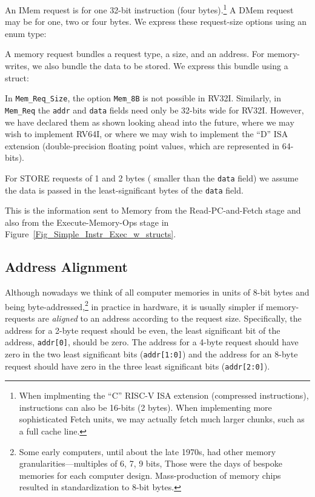 

An IMem request is for one 32-bit instruction (four
bytes).\footnote{When implmenting the ``C'' RISC-V ISA extension
(compressed instructions), instructions can also be 16-bits (2 bytes).
When implementing more sophisticated Fetch units, we may actually
fetch much larger chunks, such as a full cache line.}  A DMem request
may be for one, two or four bytes.  We express these request-size
options using an enum type:



A memory request bundles a request type, a size, and an address.  For
memory-writes, we also bundle the data to be stored.  We express this
bundle using a struct:



In \verb|Mem_Req_Size|, the option \verb|Mem_8B| is not possible in
RV32I.  Similarly, in \verb|Mem_Req| the \verb|addr| and \verb|data|
fields need only be 32-bits wide for RV32I.  However, we have declared
them as shown looking ahead into the future, where we may wish to
implement RV64I, or where we may wish to implement the ``D'' ISA
extension (double-precision floating point values, which are
represented in 64-bits).

For STORE requests of 1 and 2 bytes ({\ie} smaller than the \verb|data|
field) we assume the data is passed in the least-significant bytes of
the \verb|data| field.

This is the information sent to Memory from the Read-PC-and-Fetch
stage and also from the Execute-Memory-Ops stage in
Figure~\ref{Fig_Simple_Instr_Exec_w_structs}.


\subsection{Address Alignment}


Although nowadays we think of all computer memories in units of 8-bit
bytes and being byte-addressed,\footnote{Some early computers, until
about the late 1970s, had other memory granularities---multiples of 6,
7, 9 bits, {\etc} Those were the days of bespoke memories for each
computer design.  Mass-production of memory chips resulted in
standardization to 8-bit bytes.} in practice in hardware, it is
usually simpler if memory-requests are \emph{aligned} to an address
according to the request size.  Specifically, the address for a 2-byte
request should be even, {\ie} the least significant bit of the
address, \verb|addr[0]|, should be zero.  The address for a 4-byte
request should have zero in the two least significant bits
(\verb|addr[1:0]|) and the address for an 8-byte request should have
zero in the three least significant bits (\verb|addr[2:0]|).

